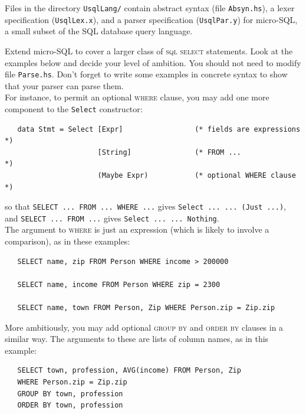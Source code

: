 \documentclass[a4paper]{article}
\begin{document}
\begin{exercise}
\end{exercise}

\begin{exercise}\label{exer-usql-parse-def}
    Files in the directory \texttt{UsqlLang/} contain 
  abstract syntax (file \texttt{Absyn.hs}), a lexer specification (\texttt{UsqlLex.x}),
  and a parser specification (\texttt{UsqlPar.y}) for micro-SQL, a
  small subset of the SQL database query language. 
  
  Extend micro-SQL to cover a larger class of \textsc{sql select}
  statements.  Look at the examples below and decide your level of
  ambition.  You should not need to modify file \texttt{Parse.hs}. 
  Don't forget to write some examples in concrete syntax to show that
  your parser can parse them. \\
  
  \noindent
  For instance, to permit an optional \textsc{where} clause, you may
  add one more component to the \texttt{Select} constructor:

{\codesetup\begin{verbatim}
   data Stmt = Select [Expr]                 (* fields are expressions *)
                      [String]               (* FROM ...               *)
                      (Maybe Expr)           (* optional WHERE clause  *)
\end{verbatim}}

\noindent
so that \verb+SELECT ... FROM ... WHERE ...+
gives \texttt{Select ... ... (Just ...)},\\
and \verb+SELECT ... FROM ...+ gives \texttt{Select ... ...
  Nothing}. \\
  
\noindent
The argument to \textsc{where} is just an expression (which is likely
to involve a comparison), as in these examples:

{\codesetup\begin{verbatim}
   SELECT name, zip FROM Person WHERE income > 200000

   SELECT name, income FROM Person WHERE zip = 2300

   SELECT name, town FROM Person, Zip WHERE Person.zip = Zip.zip
\end{verbatim}}

\noindent 
More ambitiously, you may add optional \textsc{group by} and
\textsc{order by} clauses in a similar way.  The arguments to these
are lists of column names, as in this example:

{\codesetup\begin{verbatim}
   SELECT town, profession, AVG(income) FROM Person, Zip 
   WHERE Person.zip = Zip.zip 
   GROUP BY town, profession 
   ORDER BY town, profession
\end{verbatim}}


\end{exercise}
\end{document}
